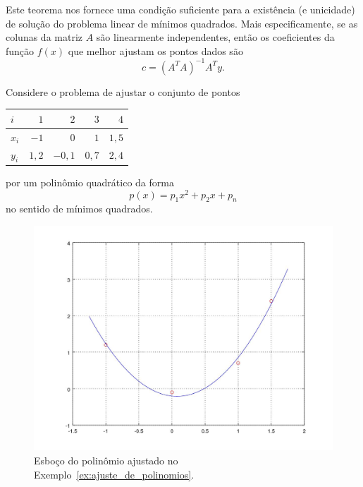 Este teorema nos fornece uma condição suficiente para a existência (e unicidade) de solução do problema linear de mínimos quadrados. Mais especificamente, se as colunas da matriz $A$ são linearmente independentes, então os coeficientes da função $f(x)$ que melhor ajustam os pontos dados são
\begin{equation}
  c = (A^TA)^{-1}A^Ty.
\end{equation}

\begin{ex}\label{ex:ajuste_de_polinomios}
  Considere o problema de ajustar o conjunto de pontos
  \begin{center}
    \begin{tabular}{l|rrrr}
      $i$ & $1$ & $2$ & $3$ & $4$ \\\hline
      $x_i$ & $-1$ & $0$ & $1$ & $1,5$\\
      $y_i$ & $1,2$ & $-0,1$ & $0,7$ & $2,4$\\\hline
    \end{tabular}
  \end{center}
  por um polinômio quadrático da forma
  \begin{equation}
    p(x) = p_1x^2 + p_2x + p_n
  \end{equation}
  no sentido de mínimos quadrados.  

  \begin{figure}[h]
    \centering
    \includegraphics[width=\textwidth]{cap_ajuste/figs/ex_mq_poli/ex_mq_poli}
    \caption{Esboço do polinômio ajustado no Exemplo~\ref{ex:ajuste_de_polinomios}.}
    \label{fig:ex_mq_poli}
  \end{figure}
  

\end{ex}
